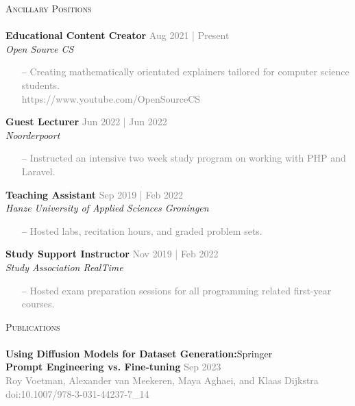 \documentclass[a4paper]{article}
\newcommand{\lineunder} {
    \vspace*{-8pt} \\
    \hspace*{-18pt} \hrulefill \\
}
\newcommand{\header} [1] {
    {\hspace*{-18pt}\vspace*{6pt} \textsc{#1}}
    \vspace*{-6pt} \lineunder
}
\begin{document}
\vspace{5mm}

\header{Ancillary Positions}
\vspace{1mm}
\textbf{Educational Content Creator} \hfill \textcolor{gray}{Aug 2021 | Present}\\
\textit{Open Source CS}\\
\vspace{-2mm}
\begin{itemize} \itemsep 1pt
	\item[--] \textcolor{gray}{Creating mathematically orientated explainers tailored for computer science students.}\\
		\textcolor{gray}{https://www.youtube.com/OpenSourceCS}
\end{itemize}
\textbf{Guest Lecturer} \hfill \textcolor{gray}{Jun 2022 | Jun 2022}\\
\textit{Noorderpoort}\\
\vspace{-2mm}
\begin{itemize} \itemsep 1pt
	\item[--] \textcolor{gray}{Instructed an intensive two week study program on working with PHP and Laravel.}
\end{itemize}
\textbf{Teaching Assistant} \hfill \textcolor{gray}{Sep 2019 | Feb 2022}\\
\textit{Hanze University of Applied Sciences Groningen}\\
\vspace{-2mm}
\begin{itemize} \itemsep 1pt
	\item[--] \textcolor{gray}{Hosted labs, recitation hours, and graded problem sets.}
\end{itemize}
\textbf{Study Support Instructor} \hfill \textcolor{gray}{Nov 2019 | Feb 2022}\\
\textit{Study Association RealTime}\\
\vspace{-2mm}
\begin{itemize} \itemsep 1pt
	\item[--] \textcolor{gray}{Hosted exam preparation sessions for all programming related first-year courses.}
\end{itemize}

\vspace{5mm}

\header{Publications}


\textbf{Using Diffusion Models for Dataset Generation:}\hfill Springer\\
\small{\textbf{Prompt Engineering vs. Fine-tuning} \hfill \textcolor{gray}{Sep 2023}}\\
\footnotesize{\textcolor{gray}{Roy Voetman, Alexander van Meekeren, Maya Aghaei, and Klaas Dijkstra} \hfill
\textcolor{gray}{doi:10.1007/978-3-031-44237-7\_14}}\\
\normalsize
\vspace{2mm}
\end{document}
